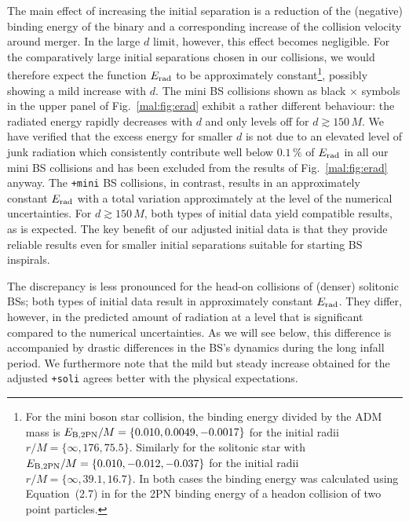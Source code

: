 The main effect of increasing the initial separation is a
reduction of the (negative) binding energy of the binary and a corresponding
increase of the collision velocity around merger. In the large
$d$ limit, however, this effect becomes negligible. For the
comparatively large initial separations chosen in our
collisions, we would therefore
expect the function $E_{\rm rad}$ to be approximately constant\footnote{
For the mini boson star collision, the binding energy divided
by the ADM mass is $E_{\rm B,2PN}/M = \{0.010,0.0049,-0.0017 \}$ for the initial
radii $r/M = \{\infty, 176, 75.5\}$. Similarly for the solitonic star with
$E_{\rm B,2PN}/M = \{0.010,-0.012,-0.037 \}$ for the initial
radii $r/M = \{\infty, 39.1, 16.7\}$.
In both cases the binding energy was calculated using Equation~(2.7) in
\cite{Simone_1995} for the 2PN binding energy of a headon collision of
two point particles.
},
possibly showing a mild increase with $d$. The mini BS collisions
shown as black $\times$ symbols in the upper panel of
Fig.~\ref{mal:fig:erad} exhibit a rather different behaviour:
the radiated energy rapidly decreases with $d$ and only levels
off for $d\gtrsim 150\,M$. We have verified that the excess
energy for smaller $d$ is not due to an elevated level of
junk radiation which consistently contribute well below
$0.1\,\%$ of $E_{\rm rad}$ in all our mini BS collisions and has
been excluded from the results of Fig.~\ref{mal:fig:erad} anyway.
The {\tt +mini} BS collisions,
in contrast, results in an approximately constant $E_{\rm rad}$
with a total variation approximately at the level of the
numerical uncertainties. For $d\gtrsim 150\,M$, both types of
initial data yield compatible results, as is expected.
The key benefit of our adjusted initial data is that they provide
reliable results even for smaller initial separations suitable
for starting BS inspirals.

The discrepancy is less pronounced for the head-on collisions
of (denser) solitonic BSs; both types of initial data result
in approximately constant $E_{\rm rad}$. They differ, however,
in the predicted amount of radiation at a level that
is significant compared to
the numerical uncertainties. As we will see below, this difference
is accompanied by drastic differences in the BS's dynamics during the
long infall period. We furthermore note that the mild but
steady increase obtained for the adjusted {\tt +soli} agrees
better with the physical expectations.

